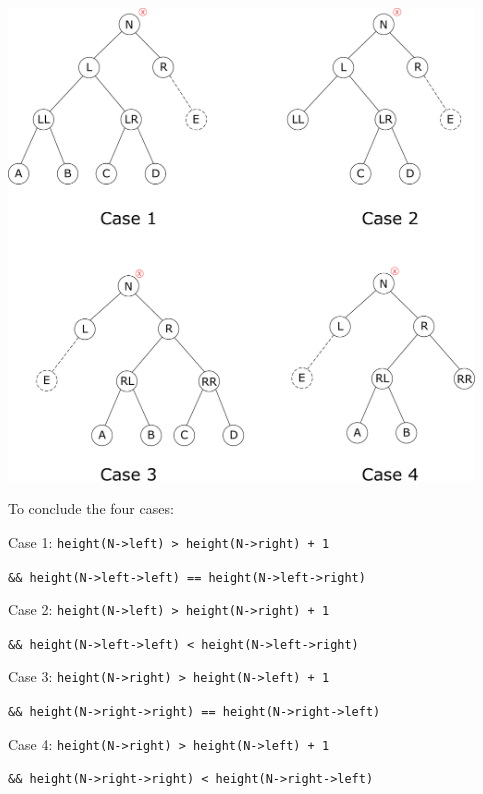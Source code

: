 \documentclass[11pt]{book}
\begin{document}
\begin{center}
\includegraphics[width=350pt]{./img/AVL-deletion.pdf}
\end{center}

To conclude the four cases:

Case 1: \texttt{height(N->left) > height(N->right) + 1}

\texttt{\&\& height(N->left->left) == height(N->left->right)}

Case 2: \texttt{height(N->left) > height(N->right) + 1}

\texttt{\&\& height(N->left->left) < height(N->left->right)}

Case 3: \texttt{height(N->right) > height(N->left) + 1}

\texttt{\&\& height(N->right->right) == height(N->right->left)}

Case 4: \texttt{height(N->right) > height(N->left) + 1}

\texttt{\&\& height(N->right->right) < height(N->right->left)}
\end{document}
